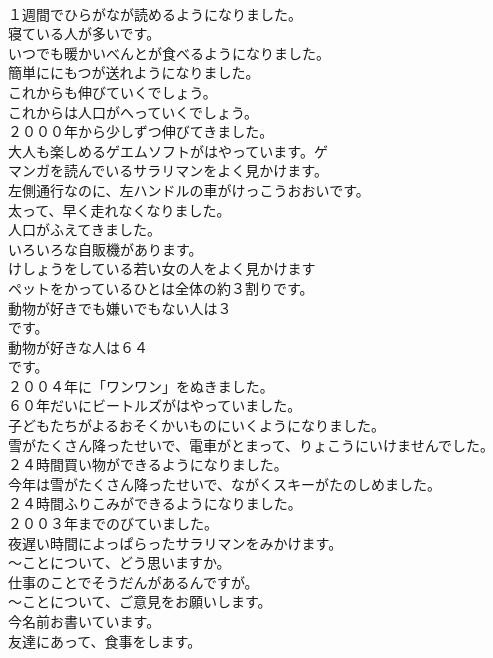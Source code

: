 \documentclass[8pt]{extreport}
\begin{document}
\begin{CJK}{UTF8}{min}
\\	１週間でひらがなが読めるようになりました。
\\	寝ている人が多いです。
\\	いつでも暖かいべんとが食べるようになりました。
\\	簡単ににもつが送れようになりました。
\\	これからも伸びていくでしょう。
\\	これからは人口がへっていくでしょう。
\\	２０００年から少しずつ伸びてきました。
\\	大人も楽しめるゲエムソフトがはやっています。ゲ
\\	マンガを読んでいるサラリマンをよく見かけます。
\\	左側通行なのに、左ハンドルの車がけっこうおおいです。
\\	太って、早く走れなくなりました。
\\	人口がふえてきました。
\\	いろいろな自販機があります。
\\	けしょうをしている若い女の人をよく見かけます
\\	ペットをかっているひとは全体の約３割りです。
\\	動物が好きでも嫌いでもない人は３
\\	です。
\\	動物が好きな人は６４
\\	です。
\\	２００４年に「ワンワン」をぬきました。
\\	６０年だいにビートルズがはやっていました。
\\	子どもたちがよるおそくかいものにいくようになりました。
\\	雪がたくさん降ったせいで、電車がとまって、りょこうにいけませんでした。
\\	２４時間買い物ができるようになりました。
\\	今年は雪がたくさん降ったせいで、ながくスキーがたのしめました。
\\	２４時間ふりこみができるようになりました。
\\	２００３年までのびていました。
\\	夜遅い時間によっぱらったサラリマンをみかけます。
\\	～ことについて、どう思いますか。
\\	仕事のことでそうだんがあるんですが。
\\	～ことについて、ご意見をお願いします。
\\	今名前お書いています。
\\	友達にあって、食事をします。

\end{CJK}
\end{document}
